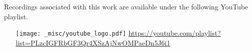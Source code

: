 \noindent
Recordings associated with this work are available under the following YouTube playlist.
\vspace{-\topsep}
\begin{itemize}
    \item[{\texttt{[image: \_misc/youtube\_logo.pdf]}}] \href{https://youtube.com/playlist?list=PLzcIGFRbGF3Qr4XSzAjNwOMPaeDn5J6i1}{https://youtube.com/playlist?list=PLzcIGFRbGF3Qr4XSzAjNwOMPaeDn5J6i1}
\end{itemize}
